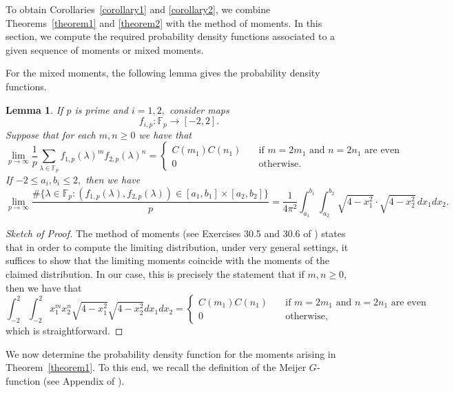 \documentclass[12pt]{amsart}
\newtheorem{lemma}[theorem]{Lemma}
\theoremstyle{definition}
\theoremstyle{remark}
\numberwithin{equation}{section}
\def\F{{\mathbb F}}
\def\F{\mathbb{F}}
\begin{document}
To obtain Corollaries~\ref{corollary1} and \ref{corollary2}, we combine Theorems~\ref{theorem1} and \ref{theorem2} with the method of moments. In this section, we compute the required probability density functions associated to a given sequence of moments or mixed moments.

For the mixed moments, the following lemma gives the probability density functions.

\begin{lemma}\label{mixedMomentsPDF}
    If $p$ is prime and $i=1,2,$ consider maps
    $$
    f_{i,p}:\F_p\to [-2,2].
    $$
    Suppose that for each $m,n\geq 0$ we have that
    $$
    \lim\limits_{p\to\infty}\frac{1}{p}\sum\limits_{\lambda\in\F_p}f_{1,p}(\lambda)^mf_{2,p}(\lambda)^n =\begin{cases}
        C(m_1)C(n_1) &\ \ \ \text{ if } m=2m_1\text{ and }n=2n_1\text{ are even}\\
        0 &\ \ \ \text{ otherwise}.
    \end{cases}
    $$
    If $-2\leq a_i,b_i\leq 2,$ then we have
    $$
    \lim\limits_{p\to\infty}\frac{\#\{\lambda\in\F_p: (f_{1,p}(\lambda),f_{2,p}(\lambda))\in[a_1,b_1]\times[a_2,b_2]\}}{p}=\frac{1}{4\pi^2}\int_{a_1}^{b_1}\int_{a_2}^{b_2}\sqrt{4-x_1^2}\cdot\sqrt{4-x_2^2} \, dx_1dx_2.
    $$
\end{lemma}

\begin{proof}[Sketch of Proof]
    
    The method of moments (see Exercises 30.5 and 30.6 of \cite{Billingsley}) states that in order to compute the limiting distribution, under very general settings, it suffices to show that the limiting moments coincide with the moments of the claimed distribution. In our case, this is precisely the statement that if $m,n\geq 0,$ then we have that 
    $$
    \int_{-2}^2\int_{-2}^2x_1^mx_2^n\sqrt{4-x_1^2}\sqrt{4-x_2^2}dx_1dx_2=\begin{cases}
        C(m_1)C(n_1) &\ \ \ \text{ if } m=2m_1\text{ and }n=2n_1\text{ are even}\\
        0 &\ \ \ \text{ otherwise,}
    \end{cases}
    $$
    which is straightforward.
\end{proof}



We now determine the probability density function for the moments arising in Theorem~\ref{theorem1}. To this end, we recall the definition of the Meijer $G$-function (see Appendix of \cite{IntTransforms}).
\end{document}
